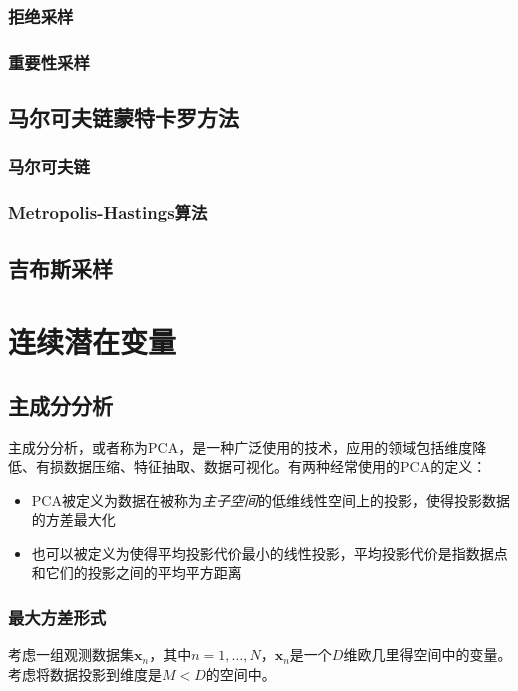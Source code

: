 \documentclass[11pt]{ctexbook}
\begin{document}
\subsection{拒绝采样}
\subsection{重要性采样}
\section{马尔可夫链蒙特卡罗方法}
\subsection{马尔可夫链}
\subsection{Metropolis-Hastings算法}
\section{吉布斯采样}

\chapter{连续潜在变量}
\section{主成分分析}
主成分分析，或者称为PCA，是一种广泛使用的技术，应用的领域包括维度降低、有损数据压缩、特征抽取、数据可视化。有两种经常使用的PCA的定义：
\begin{itemize}
	\item PCA被定义为数据在被称为\emph{主子空间}的低维线性空间上的投影，使得投影数据的方差最大化
	\item 也可以被定义为使得平均投影代价最小的线性投影，平均投影代价是指数据点和它们的投影之间的平均平方距离
\end{itemize}
\subsection{最大方差形式}
考虑一组观测数据集${\bm x_n}$，其中$n=1,\ldots,N$，$\bm x_n$是一个$D$维欧几里得空间中的变量。考虑将数据投影到维度是$M<D$的空间中。
\end{document}
